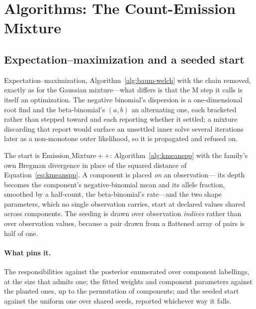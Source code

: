 \documentclass[11pt,a4paper]{article}
\begin{document}
\section{Algorithms: The Count-Emission Mixture}
\label{sec:emissionmixture:algorithms}

\subsection{Expectation--maximization and a seeded start}
Expectation--maximization, Algorithm~\ref{alg:baum-welch} with the chain
removed, exactly as for the Gaussian mixture---what differs is that the M step
it calls is itself an optimization. The negative binomial's dispersion is a
one-dimensional root find and the beta-binomial's $(a, b)$ an alternating one,
each bracketed rather than stepped toward and each reporting whether it
settled; a mixture discarding that report would surface an unsettled inner
solve several iterations later as a non-monotone outer likelihood, so it is
propagated and refused on.

The start is $\mathrm{Emission\_Mixture}{+}{+}$: Algorithm~\ref{alg:kmeanspp}
with the family's own Bregman divergence in place of the squared distance of
Equation~\ref{eq:kmeanspp}. A component is placed \emph{on} an observation---
its depth becomes the component's negative-binomial mean and its allele
fraction, smoothed by a half-count, the beta-binomial's rate---and the two
shape parameters, which no single observation carries, start at declared
values shared across components. The seeding is drawn over observation
\emph{indices} rather than over observation values, because a pair drawn from
a flattened array of pairs is half of one.

\paragraph{What pins it.}
The responsibilities against the posterior enumerated over component
labellings, at the size that admits one; the fitted weights and component
parameters against the planted ones, up to the permutation of components; and
the seeded start against the uniform one over shared seeds, reported whichever
way it falls.
\end{document}
